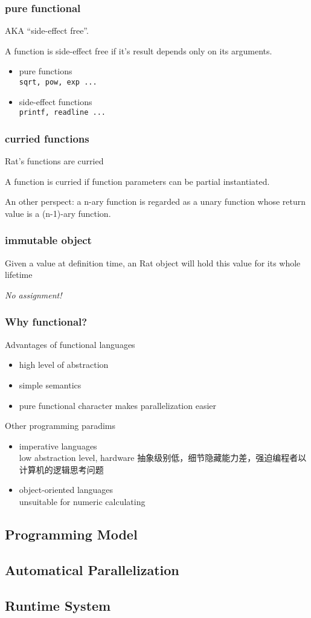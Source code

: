 \documentclass{beamer}
\begin{document}
\begin{frame}
  \frametitle{pure functional}
  AKA ``side-effect free''. 
  \begin{definition}
    A function is side-effect free if it's result depends only on its arguments.
  \end{definition}
  \begin{itemize}
    \item pure functions \\\texttt{sqrt, pow, exp ...}
    \item side-effect functions \\\texttt{printf, readline ...}
  \end{itemize}
\end{frame}

\begin{frame}
  \frametitle{curried functions}
  Rat's functions are curried
  \begin{definition}
    A function is curried if function parameters can be partial instantiated.
  \end{definition}
  An other perspect: a n-ary function is regarded as a unary function whose return value
  is a (n-1)-ary function.
\end{frame}

\begin{frame}
  \frametitle{immutable object}
  Given a value at definition time, an Rat object will hold
  this value for its whole lifetime

  \emph{No assignment!}         %
\end{frame}

\begin{frame}
  \frametitle{Why functional?}
  Advantages of functional languages
  \begin{itemize}
    \item high level of abstraction
    \item simple semantics
    \item pure functional character makes parallelization easier
  \end{itemize}

  Other programming paradims
  \begin{itemize}
    \item imperative languages\\
      low abstraction level, hardware
      抽象级别低，细节隐藏能力差，强迫编程者以计算机的逻辑思考问题
    \item object-oriented languages\\
      unsuitable for numeric calculating
  \end{itemize}
\end{frame}

\subsection{Programming Model}
\subsection{Automatical Parallelization}
\subsection{Runtime System}
\end{document}
